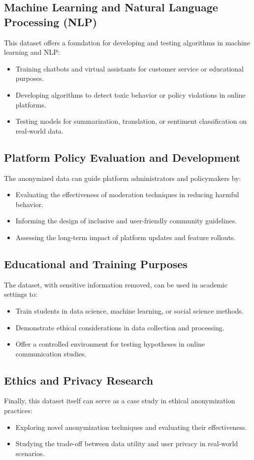 \subsection{Machine Learning and Natural Language Processing (NLP)}
This dataset offers a foundation for developing and testing algorithms in machine learning and NLP:
\begin{itemize}
    \item Training chatbots and virtual assistants for customer service or educational purposes.
    \item Developing algorithms to detect toxic behavior or policy violations in online platforms.
    \item Testing models for summarization, translation, or sentiment classification on real-world data.
\end{itemize}

\subsection{Platform Policy Evaluation and Development}
The anonymized data can guide platform administrators and policymakers by:
\begin{itemize}
    \item Evaluating the effectiveness of moderation techniques in reducing harmful behavior.
    \item Informing the design of inclusive and user-friendly community guidelines.
    \item Assessing the long-term impact of platform updates and feature rollouts.
\end{itemize}

\subsection{Educational and Training Purposes}
The dataset, with sensitive information removed, can be used in academic settings to:
\begin{itemize}
    \item Train students in data science, machine learning, or social science methods.
    \item Demonstrate ethical considerations in data collection and processing.
    \item Offer a controlled environment for testing hypotheses in online communication studies.
\end{itemize}

\subsection{Ethics and Privacy Research}
Finally, this dataset itself can serve as a case study in ethical anonymization practices:
\begin{itemize}
    \item Exploring novel anonymization techniques and evaluating their effectiveness.
    \item Studying the trade-off between data utility and user privacy in real-world scenarios.
\end{itemize}

\fi
